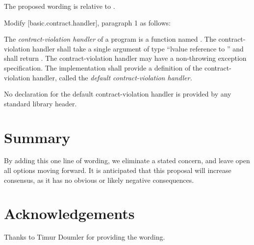 The proposed wording is relative to \cite{P2900R13}.

Modify [basic.contract.handler], paragraph 1 as follows:

\begin{adjustwidth}{0.5cm}{0.5cm}
The \emph{contract-violation handler} of a program is a function named \mbox{}. The contract-violation handler shall take a single argument of type ``lvalue reference to  \mbox{}” and shall return . The contract-violation handler may have a non-throwing exception specification. The implementation shall provide a definition of the contract-violation handler, called the \emph{default contract-violation handler.}
\begin{note}
No declaration for the default contract-violation handler is provided by any standard library header.
\end{note}
\end{adjustwidth}

\section{Summary}

By adding this one line of wording, we eliminate a stated concern, and leave open all options moving forward. It is anticipated that this proposal will increase consensus, as it has no obvious or likely negative consequences.


\section*{Acknowledgements}

Thanks to Timur Doumler for providing the wording.


\renewcommand{\addcontentsline}[3]{}%







